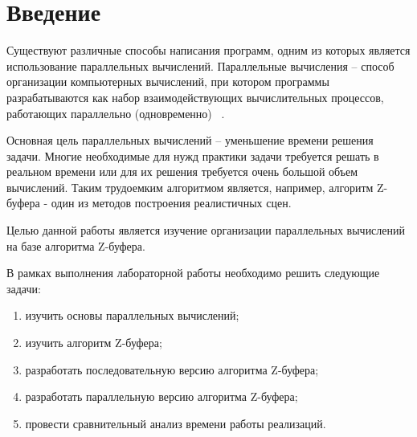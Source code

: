 \chapter*{Введение}

Существуют различные способы написания программ, одним из которых является использование параллельных вычислений. Параллельные вычисления – способ организации компьютерных вычислений, при котором программы разрабатываются как набор взаимодействующих вычислительных процессов, работающих параллельно (одновременно) ~\cite{first_article}. 

Основная цель параллельных вычислений – уменьшение времени
решения задачи. Многие необходимые для нужд практики задачи требуется решать в реальном времени или для их решения требуется очень большой объем вычислений. Таким трудоемким алгоритмом является, например, алгоритм Z-буфера - один из методов построения реалистичных сцен.

Целью данной работы является изучение организации параллельных вычислений на базе алгоритма Z-буфера.


В рамках выполнения лабораторной работы необходимо решить следующие задачи: 
\begin{enumerate}[label={\arabic*)}]
	\item изучить основы параллельных вычислений;
	\item изучить алгоритм Z-буфера;
	\item разработать последовательную версию алгоритма Z-буфера;
        \item разработать параллельную версию алгоритма Z-буфера;
	\item провести сравнительный анализ времени работы реализаций.
\end{enumerate}